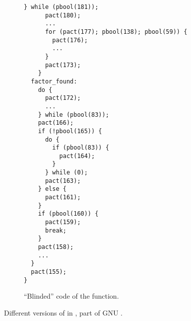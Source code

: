 \begin{figure}[hbtp]
\begin{subfigure}{0.46\textwidth}
\begin{lstlisting}[basicstyle=\tiny\ttfamily]
      } while (pbool(181));
      pact(180);
      ...
      for (pact(177); pbool(138); pbool(59)) {
        pact(176);
        ...
      }
      pact(173);
    }
  factor_found:
    do {
      pact(172);
      ...
    } while (pbool(83));
    pact(166);
    if (!pbool(165)) {
      do {
        if (pbool(83)) {
          pact(164);
        }
      } while (0);
      pact(163);
    } else {
      pact(161);
    }
    if (pbool(160)) {
      pact(159);
      break;
    }
    pact(158);
    ...
  }
  pact(155);
}
 \end{lstlisting}
 \caption{\label{c:blinded}``Blinded'' code of the function.}
 \end{subfigure}
 \caption{Different versions of  in , part of GNU .}
 \vspace{3mm} %
\end{figure}
